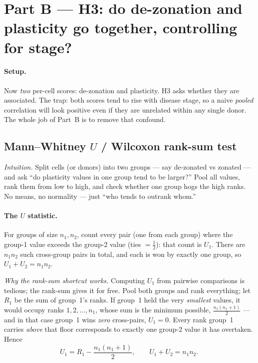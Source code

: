 \documentclass[11pt]{article}
\begin{document}
\section{Part B --- H3: do de-zonation and plasticity go together, controlling for stage?}

\paragraph{Setup.} Now \emph{two} per-cell scores: de-zonation and plasticity. H3 asks whether they are associated. The trap: both scores tend to rise with disease stage, so a naive \emph{pooled} correlation will look positive even if they are unrelated within any single donor. The whole job of Part~B is to remove that confound.

\subsection{Mann--Whitney $U$ / Wilcoxon rank-sum test}

\textit{Intuition.} Split cells (or donors) into two groups --- say de-zonated vs zonated --- and ask ``do plasticity values in one group tend to be larger?'' Pool all values, rank them from low to high, and check whether one group hogs the high ranks. No means, no normality --- just ``who tends to outrank whom.''

\paragraph{The $U$ statistic.} For groups of size $n_1, n_2$, count every pair (one from each group) where the group-1 value exceeds the group-2 value (ties $= \tfrac12$): that count is $U_1$. There are $n_1 n_2$ such cross-group pairs in total, and each is won by exactly one group, so $U_1 + U_2 = n_1 n_2$.

\emph{Why the rank-sum shortcut works.} Computing $U_1$ from pairwise comparisons is tedious; the rank-sum gives it for free. Pool both groups and rank everything; let $R_1$ be the sum of group~1's ranks. If group~1 held the very \emph{smallest} values, it would occupy ranks $1,2,\dots,n_1$, whose sum is the minimum possible, $\tfrac{n_1(n_1+1)}{2}$ --- and in that case group~1 wins \emph{zero} cross-pairs, $U_1=0$. Every rank group~1 carries \emph{above} that floor corresponds to exactly one group-2 value it has overtaken. Hence
\[
U_1 = R_1 - \frac{n_1(n_1+1)}{2}, \qquad U_1 + U_2 = n_1 n_2.
\]
\end{document}
